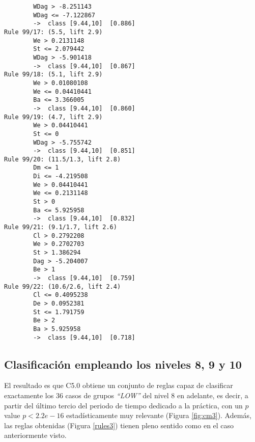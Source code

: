 \begin{tcolorbox}[title=Reglas de clasificación para identificar intervalos de notas.]
\begin{multicols}{3}
\begin{verbatim}
        WDag > -8.251143
        WDag <= -7.122867
        ->  class [9.44,10]  [0.886]
Rule 99/17: (5.5, lift 2.9)
        We > 0.2131148
        St <= 2.079442
        WDag > -5.901418
        ->  class [9.44,10]  [0.867]
Rule 99/18: (5.1, lift 2.9)
        We > 0.01080108
        We <= 0.04410441
        Ba <= 3.366005
        ->  class [9.44,10]  [0.860]
Rule 99/19: (4.7, lift 2.9)
        We > 0.04410441
        St <= 0
        WDag > -5.755742
        ->  class [9.44,10]  [0.851]
Rule 99/20: (11.5/1.3, lift 2.8)
        Dm <= 1
        Di <= -4.219508
        We > 0.04410441
        We <= 0.2131148
        St > 0
        Ba <= 5.925958
        ->  class [9.44,10]  [0.832]
Rule 99/21: (9.1/1.7, lift 2.6)
        Cl > 0.2792208
        We > 0.2702703
        St > 1.386294
        Dag > -5.204007
        Be > 1
        ->  class [9.44,10]  [0.759]
Rule 99/22: (10.6/2.6, lift 2.4)
        Cl <= 0.4095238
        De > 0.0952381
        St <= 1.791759
        Be > 2
        Ba > 5.925958
        ->  class [9.44,10]  [0.718]
    \end{verbatim}
  \end{multicols}
\label{rules5}
\end{tcolorbox}

\subsection{Clasificación empleando los niveles 8, 9 y 10}

El resultado es que C5.0 obtiene un conjunto de reglas capaz de clasificar exactamente los $36$ casos de grupos \emph{``LOW''} del nivel $8$ en adelante, es decir, a partir del último tercio del periodo de tiempo dedicado a la práctica, con un $p$ value $p < 2.2e-16$ estadísticamente muy relevante (Figura \ref{fig:cm3}). Además, las reglas obtenidas (Figura \ref{rules3}) tienen pleno sentido como en el caso anteriormente visto.

